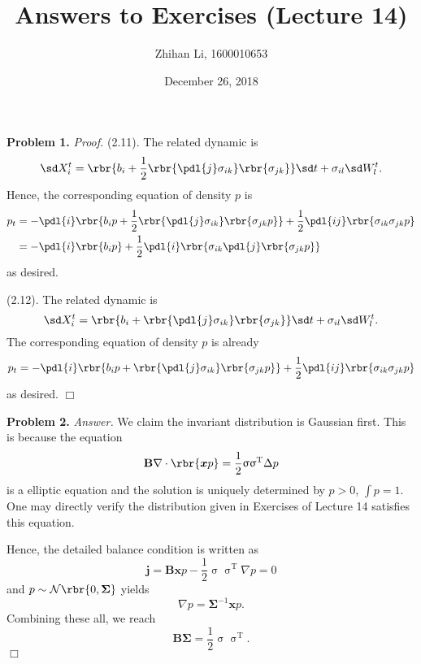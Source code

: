 \documentclass[english, nochinese]{pnote}
\title{Answers to Exercises (Lecture 14)}
\author{Zhihan Li, 1600010653}
\date{December 26, 2018}
\begin{document}
\maketitle

\textbf{Problem 1.} \textit{Proof.} (2.11). The related dynamic is
\begin{equation}
\sd X^t_i = \rbr{ b_i + \frac{1}{2} \rbr{ \pdl{j} \sigma_{ i k } } \rbr{ \sigma_{ j k } } } \sd t + \sigma_{ i l } \sd W_l^t.
\end{equation}
Hence, the corresponding equation of density $p$ is
\begin{equation}
\begin{split}
p_t &= -\pdl{i} \rbr{ b_i p + \frac{1}{2} \rbr{ \pdl{j} \sigma_{ i k } } \rbr{ \sigma_{ j k } p } } + \frac{1}{2} \pdl{ i j } \rbr{ \sigma_{ i k } \sigma_{ j k } p } \\
&= -\pdl{i} \rbr{ b_i p } + \frac{1}{2} \pdl{i} \rbr{ \sigma_{ i k } \pdl{j} \rbr{ \sigma_{ j k } p } }
\end{split}
\end{equation}
as desired.

(2.12). The related dynamic is
\begin{equation}
\sd X^t_i = \rbr{ b_i + \rbr{ \pdl{j} \sigma_{ i k } } \rbr{ \sigma_{ j k } } } \sd t + \sigma_{ i l } \sd W_l^t.
\end{equation}
The corresponding equation of density $p$ is already
\begin{equation}
p_t = -\pdl{i} \rbr{ b_i p + \rbr{ \pdl{j} \sigma_{ i k } } \rbr{ \sigma_{ j k } p } } + \frac{1}{2} \pdl{ i j } \rbr{ \sigma_{ i k } \sigma_{ j k } p }
\end{equation}
as desired.
\hfill$\Box$

\textbf{Problem 2.} \textit{Answer.} We claim the invariant distribution is Gaussian first. This is because the equation
\begin{equation}
\mathbf{B} \nabla \cdot \rbr{ \bm{x} p } = \frac{1}{2} \upsigma \upsigma^{\text{T}} \Delta p
\end{equation}
is a elliptic equation and the solution is uniquely determined by $ p > 0 $, $ \int p = 1 $. One may directly verify the distribution given in Exercises of Lecture 14 satisfies this equation.

Hence, the detailed balance condition is written as
\begin{equation}
\bm{j} = \mathbf{B} \bm{x} p - \frac{1}{2} \upsigma \upsigma^{\text{T}} \nabla p = 0
\end{equation}
and $ p \sim \mathcal{N} \rbr{ 0, \bm{\Sigma} } $ yields
\begin{equation}
\nabla p = \bm{\Sigma}^{-1} \bm{x} p.
\end{equation}
Combining these all, we reach
\begin{equation}
\mathbf{B} \bm{\Sigma} = \frac{1}{2} \upsigma \upsigma^{\text{T}}.
\end{equation}
\hfill$\Box$
\end{document}

